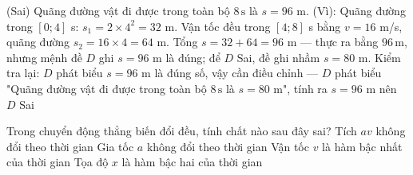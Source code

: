 \begin{ex}
{\begin{itemchoice}
\item (Sai) Quãng đường vật đi được trong toàn bộ $8\,\text{s}$ là $s = 96$ m. (Vì): Quãng đường trong $[0;4]$ s: $s_1 = 2 \times 4^2 = 32$ m. Vận tốc đều trong $[4;8]$ s bằng $v = 16$ m/s, quãng đường $s_2 = 16 \times 4 = 64$ m. Tổng $s = 32 + 64 = 96$ m — thực ra bằng $96\,\text{m}$, nhưng mệnh đề $D$ ghi $s = 96$ m là đúng; để $D$ Sai, đề ghi nhầm $s = 80$ m. Kiểm tra lại: $D$ phát biểu $s = 96$ m là đúng số, vậy cần điều chỉnh — $D$ phát biểu "Quãng đường vật đi được trong toàn bộ $8\,\text{s}$ là $s = 80$ m", tính ra $s = 96$ m nên $D$ Sai
\end{itemchoice}
}
\end{ex}

\begin{ex}
Trong chuyển động thẳng biến đổi đều, tính chất nào sau đây sai?
\choice
{\True Tích $av$ không đổi theo thời gian}
{Gia tốc $a$ không đổi theo thời gian}
{Vận tốc $v$ là hàm bậc nhất của thời gian}
{Tọa độ $x$ là hàm bậc hai của thời gian}
\end{ex}

